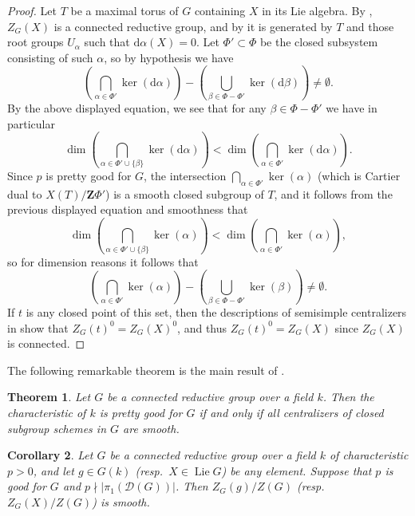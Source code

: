 \documentclass[11pt,reqno]{amsart}
\newtheorem{theorem}{Theorem}[section]
\newtheorem{cor}[theorem]{Corollary}
\theoremstyle{definition}
\newcommand{\bZ}{{\mathbf Z}}
\newcommand{\sD}{{\mathscr D}}
\DeclareMathOperator{\Lie}{Lie}
\begin{document}
\begin{proof}
Let $T$ be a maximal torus of $G$ containing $X$ in its Lie algebra. By \cite[Prop.\ 3.7]{Integral-Springer}, $Z_G(X)$ is a connected reductive group, and by \cite[Lem.\ 3.7]{SteinbergTorsion} it is generated by $T$ and those root groups $U_{\alpha}$ such that $\mathrm{d}\alpha(X) = 0$. Let $\Phi' \subset \Phi$ be the closed subsystem consisting of such $\alpha$, so by hypothesis we have
\[
\left(\bigcap_{\alpha \in \Phi'} \ker(\mathrm{d}\alpha)\right) - \left(\bigcup_{\beta \in \Phi - \Phi'} \ker(\mathrm{d}\beta)\right) \neq \emptyset.
\]
By the above displayed equation, we see that for any $\beta \in \Phi - \Phi'$ we have in particular
\[
\dim\left(\bigcap_{\alpha \in \Phi' \cup \{\beta\}} \ker(\mathrm{d}\alpha)\right) < \dim\left(\bigcap_{\alpha \in \Phi'} \ker(\mathrm{d}\alpha)\right).
\]
Since $p$ is pretty good for $G$, the intersection $\bigcap_{\alpha \in \Phi'} \ker(\alpha)$ (which is Cartier dual to $X(T)/\bZ\Phi'$) is a smooth closed subgroup of $T$, and it follows from the previous displayed equation and smoothness that
\[
\dim\left(\bigcap_{\alpha \in \Phi' \cup \{\beta\}} \ker(\alpha)\right) < \dim\left(\bigcap_{\alpha \in \Phi'} \ker(\alpha)\right),
\]
so for dimension reasons it follows that
\[
\left(\bigcap_{\alpha \in \Phi'} \ker(\alpha)\right) - \left(\bigcup_{\beta \in \Phi - \Phi'} \ker(\beta)\right) \neq \emptyset.
\]
If $t$ is any closed point of this set, then the descriptions of semisimple centralizers in \cite[Lems.\ 2.14 and 3.7]{SteinbergTorsion} show that $Z_G(t)^0 = Z_G(X)^0$, and thus $Z_G(t)^0 = Z_G(X)$ since $Z_G(X)$ is connected.
\end{proof}

The following remarkable theorem is the main result of \cite{Herpel}.

\begin{theorem}\label{theorem:herpels-theorem}
Let $G$ be a connected reductive group over a field $k$. Then the characteristic of $k$ is pretty good for $G$ if and only if all centralizers of closed subgroup schemes in $G$ are smooth.
\end{theorem}

\begin{cor}\label{corollary:smooth-centralizer-pretty-good-characteristic}
Let $G$ be a connected reductive group over a field $k$ of characteristic $p > 0$, and let $g \in G(k)$ (resp.\ $X \in \Lie G$) be any element. Suppose that $p$ is good for $G$ and $p \nmid |\pi_1(\sD(G))|$. Then $Z_G(g)/Z(G)$ (resp.\ $Z_G(X)/Z(G)$) is smooth.
\end{cor}
\end{document}
